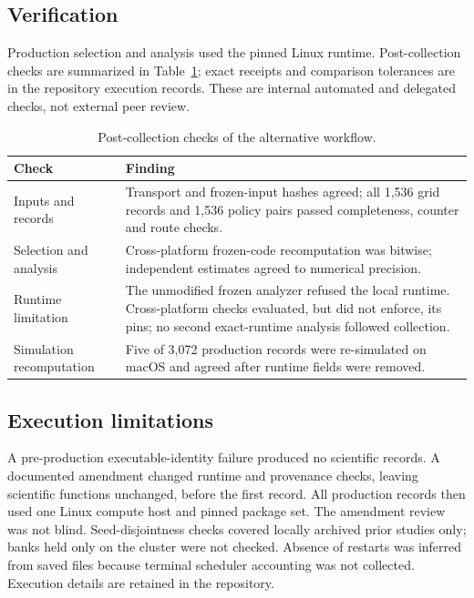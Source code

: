 \documentclass[11pt]{article}
\begin{document}
\subsection{Verification}\label{sec:s-alt-verification}
Production selection and analysis used the pinned Linux runtime. Post-collection
checks are summarized in Table~\ref{tab:alt-verif}; exact receipts and comparison
tolerances are in the repository execution records. These are internal
automated and delegated checks, not external peer review.
\begin{table}[htbp]\centering\small
\caption{Post-collection checks of the alternative workflow.}\label{tab:alt-verif}
\begin{tabular}{p{.24\linewidth}p{.67\linewidth}}\toprule
Check & Finding\\\midrule
Inputs and records & Transport and frozen-input hashes agreed; all 1,536 grid records and 1,536 policy pairs passed completeness, counter and route checks.\\
Selection and analysis & Cross-platform frozen-code recomputation was bitwise; independent estimates agreed to numerical precision.\\
Runtime limitation & The unmodified frozen analyzer refused the local runtime. Cross-platform checks evaluated, but did not enforce, its pins; no second exact-runtime analysis followed collection.\\
Simulation recomputation & Five of 3,072 production records were re-simulated on macOS and agreed after runtime fields were removed.\\
\bottomrule\end{tabular}
\end{table}

\subsection{Execution limitations}\label{sec:s-alt-provenance}
A pre-production executable-identity failure produced no scientific records.
A documented amendment changed runtime and provenance checks, leaving scientific
functions unchanged, before the first record. All production records then used
one Linux compute host and pinned package set. The amendment review was not
blind. Seed-disjointness checks covered locally archived prior studies only;
banks held only on the cluster were not checked. Absence of restarts was inferred
from saved files because terminal scheduler accounting was not collected.
Execution details are retained in the repository.
\end{document}
